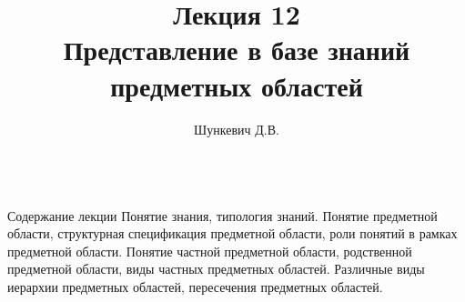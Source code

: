 \title{Лекция 12\\Представление в базе знаний предметных областей}
\author[]{Шункевич Д.В.}

\begin{frame}
	\titlepage
\end{frame}

\begin{frame}{\\Содержание лекции}
	\topline
	\justifying
	Понятие знания, типология знаний. Понятие предметной области, структурная спецификация предметной области, роли понятий в рамках предметной области. Понятие частной предметной области, родственной предметной области, виды частных предметных областей. Различные виды иерархии предметных областей, пересечения предметных областей.
\end{frame}